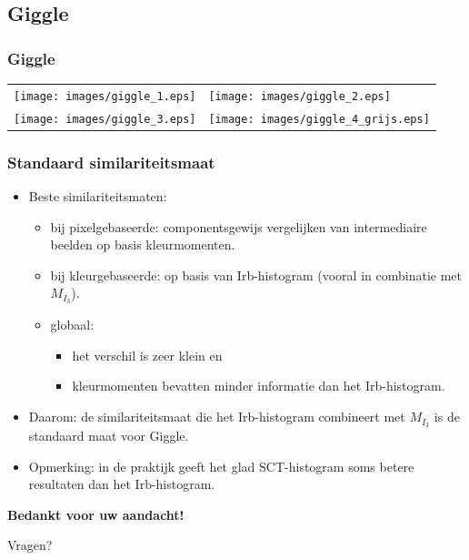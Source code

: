 \documentclass[dutch]{beamer}
\theoremstyle{definition}
\theoremstyle{remark}
\theoremstyle{example}
\begin{document}
\subsection{Giggle}
\frame
{
  \frametitle{Giggle}
  
  \centering
  \begin{tabular}{@{}rl@{}}
  \texttt{[image: images/giggle\_1.eps]} &
  \texttt{[image: images/giggle\_2.eps]} \vspace{8pt}\\
  \texttt{[image: images/giggle\_3.eps]} &
  \texttt{[image: images/giggle\_4\_grijs.eps]}
  \end{tabular}
}
\frame
{
	\frametitle{Standaard similariteitsmaat}
	
	\begin{itemize}
	\item Beste similariteitsmaten:
	\begin{itemize}
      \item bij pixelgebaseerde: componentsgewijs vergelijken van intermediaire
      beelden op basis kleurmomenten.
      \item bij kleurgebaseerde: op basis van Irb-histogram (vooral in combinatie
      met $M_{I_3}$). 
      \item globaal:
      \begin{itemize}
        \item het verschil is zeer klein en
        \item kleurmomenten bevatten minder informatie dan het Irb-histogram.
      \end{itemize}
    \end{itemize}
    \item Daarom: de similariteitsmaat die het Irb-histogram combineert met $M_{I_3}$
    is de standaard maat voor Giggle.
    \item Opmerking: in de praktijk geeft het glad SCT-histogram soms betere resultaten dan
    het Irb-histogram.
    \end{itemize}
}


\plainframe
{
  \begin{center}
  \Huge \textbf{\color{white}Bedankt voor uw aandacht!}
  \end{center}
  \vspace{10pt}
  \begin{center}
  \LARGE Vragen?
  \end{center}
}
\end{document}
